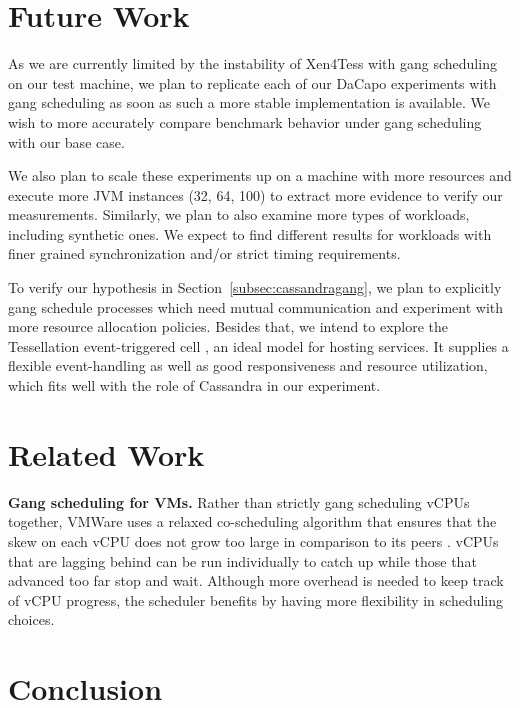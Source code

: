 \documentclass{sig-alternate}
\begin{document}
\section{Future Work}
As we are currently limited by the instability of Xen4Tess with gang scheduling on our test machine, we plan to replicate each of our DaCapo experiments with gang scheduling as soon as such a more stable implementation is available. We wish to more accurately compare benchmark behavior under gang scheduling with our base case.

We also plan to scale these experiments up on a machine with more resources and execute more JVM instances (32, 64, 100) to extract more evidence to verify our measurements. Similarly, we plan to also examine more types of workloads, including synthetic ones. We expect to find different results for workloads with finer grained synchronization and/or strict timing requirements.


To verify our hypothesis in Section~\ref{subsec:cassandragang}, we plan to explicitly gang schedule processes which need mutual communication and experiment with more resource allocation policies. Besides that, we intend to explore the Tessellation event-triggered cell \cite{colmenares2013tessellation}, an ideal model for hosting services. It supplies a flexible event-handling as well as good responsiveness and resource utilization, which fits well with the role of Cassandra in our experiment.

\section{Related Work}
\textbf{Gang scheduling for VMs.} Rather than strictly gang scheduling vCPUs together, VMWare uses a relaxed co-scheduling algorithm that ensures that the skew on each vCPU does not grow too large in comparison to its peers \cite{vmware:whitepaper}. vCPUs that are lagging behind can be run individually to catch up while those that advanced too far stop and wait. Although more overhead is needed to keep track of vCPU progress, the scheduler benefits by having more flexibility in scheduling choices.

\section{Conclusion}
\end{document}
